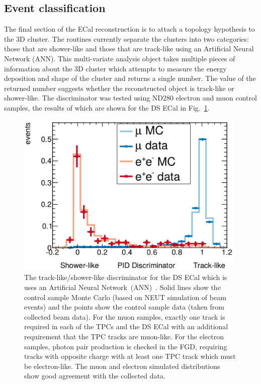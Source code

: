 \subsection{Event classification}
\label{subsec:ECalParticleIdentification}
The final section of the ECal reconstruction is to attach a topology hypothesis to the 3D cluster.  The routines currently separate the clusters into two categories: those that are shower-like and those that are track-like using an Artificial Neural Network (ANN).  This multi-variate analysis object takes multiple pieces of information about the 3D cluster which attempts to measure the energy deposition and shape of the cluster and returns a single number.  The value of the returned number suggests whether the reconstructed object is track-like or shower-like. The discriminator was tested using ND280 electron and muon control samples, the results of which are shown for the DS ECal in Fig.~\ref{fig:ECalTrShVal}.

\begin{figure}[t!]
  \centering
  \includegraphics[width=11cm]{images/software/ecal_trshval.pdf}
  \caption{The track-like/shower-like discriminator for the DS ECal which is uses an Artificial Neural Network~(ANN)~\cite{1748-0221-8-10-P10019}.  Solid lines show the control sample Monte Carlo (based on NEUT simulation of beam events) and the points show the control sample data (taken from collected beam data).  For the muon samples, exactly one track is required in each of the TPCs and the DS ECal with an additional requirement that the TPC tracks are muon-like.  For the electron samples, photon pair production is checked in the FGD, requiring tracks with opposite charge with at least one TPC track which must be electron-like.  The muon and electron simulated distributions show good agreement with the collected data.}
  \label{fig:ECalTrShVal}
\end{figure}


